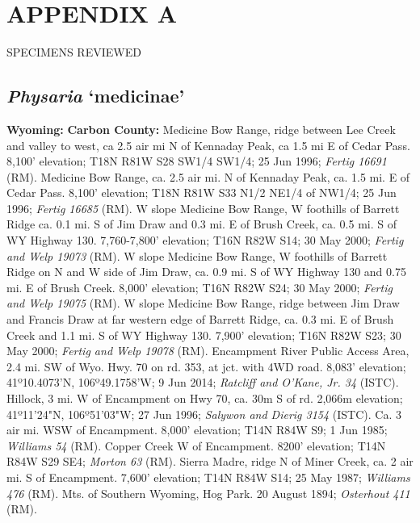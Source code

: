 \chapter*{APPENDIX A}
\begin{center}
SPECIMENS REVIEWED
\end{center}

\section*{\textit{Physaria} ‘medicinae’}

  \textbf{Wyoming:}
  \textbf{Carbon County:}
Medicine Bow Range, ridge between Lee Creek and valley to west, ca 2.5 air mi N
of Kennaday Peak, ca 1.5 mi E of Cedar Pass. 8,100' elevation; T18N R81W S28
SW1/4 SW1/4; 25 Jun 1996; \textit{Fertig 16691} (RM).
Medicine Bow Range, ca. 2.5 air mi. N of Kennaday Peak, ca. 1.5 mi. E of
Cedar Pass. 8,100’ elevation; T18N R81W S33 N1/2 NE1/4 of NW1/4; 25 Jun 1996;
\textit{Fertig 16685} (RM).
W slope Medicine Bow Range, W foothills of Barrett Ridge ca. 0.1 mi. S of
Jim Draw and 0.3 mi. E of Brush Creek, ca. 0.5 mi. S of WY Highway 130.
7,760-7,800’ elevation; T16N R82W S14; 30 May 2000;
\textit{Fertig and Welp 19073} (RM).
W slope Medicine Bow Range, W foothills of Barrett Ridge on N and W side of
Jim Draw, ca. 0.9 mi. S of WY Highway 130 and 0.75 mi. E of Brush Creek.
8,000’ elevation; T16N R82W S24; 30 May 2000;
\textit{Fertig and Welp 19075} (RM).
W slope Medicine Bow Range, ridge between Jim Draw and Francis Draw at far
western edge of Barrett Ridge, ca. 0.3 mi. E of Brush Creek and 1.1 mi. S of WY
Highway 130. 7,900’ elevation; T16N R82W S23; 30 May 2000;
\textit{Fertig and Welp 19078} (RM).
Encampment River Public Access Area, 2.4 mi. SW of Wyo. Hwy. 70 on rd. 353,
at jct. with 4WD road. 8,083' elevation; 41º10.4073'N, 106º49.1758'W;
9 Jun 2014; \textit{Ratcliff and O'Kane, Jr. 34} (ISTC).
Hillock, 3 mi. W of Encampment on Hwy 70, ca. 30m S of rd. 2,066m elevation;
41º11'24"N, 106º51'03"W; 27 Jun 1996; \textit{Salywon and Dierig 3154} (ISTC).
Ca. 3 air mi. WSW of Encampment. 8,000’ elevation; T14N R84W S9; 1 Jun 1985;
\textit{Williams 54} (RM).
Copper Creek W of Encampment. 8200’ elevation; T14N R84W S29 SE4;
\textit{Morton 63} (RM).
Sierra Madre, ridge N of Miner Creek, ca. 2 air mi. S of Encampment.
7,600’ elevation; T14N R84W S14; 25 May 1987; \textit{Williams 476} (RM).
Mts. of Southern Wyoming, Hog Park. 20 August 1894; \textit{Osterhout 411} (RM).
